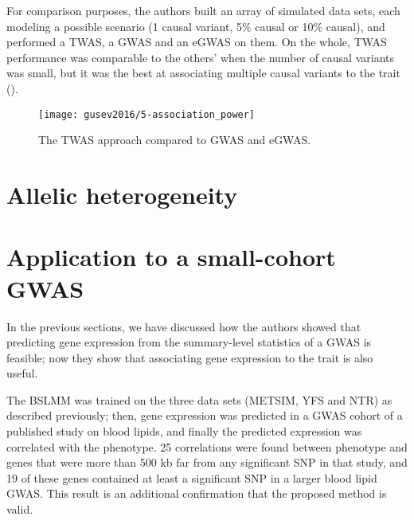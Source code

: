 \documentclass[../main.tex]{subfiles}
\begin{document}
For comparison purposes, the authors built an array of simulated data 
sets, each modeling a possible scenario (1 causal variant, 5\% causal or 
10\% causal), and performed a TWAS, a GWAS and an eGWAS on them. On the 
whole, TWAS performance was comparable to the others' when the number of 
causal variants was small, but it was the best at associating multiple 
causal variants to the trait ().

\begin{figure}
	\texttt{[image: gusev2016/5-association\_power]}
	\caption{The TWAS approach compared to GWAS and eGWAS.}
\end{figure}

\section{Allelic heterogeneity}


\section{Application to a small-cohort GWAS}

In the previous sections, we have discussed how the authors showed that 
predicting gene expression from the summary-level statistics of a GWAS 
is feasible; now they show that associating gene expression to the trait 
is also useful.

The BSLMM was trained on the three data sets (METSIM, YFS and NTR) as 
described previously; then, gene expression was predicted in a GWAS 
cohort of a published study on blood lipids, and finally the predicted 
expression was correlated with the phenotype. 25 correlations were found 
between phenotype and genes that were more than 500 kb far from any 
significant SNP in that study, and 19 of these genes contained at least 
a significant SNP in a larger blood lipid GWAS. This result is an 
additional confirmation that the proposed method is valid.
\end{document}
